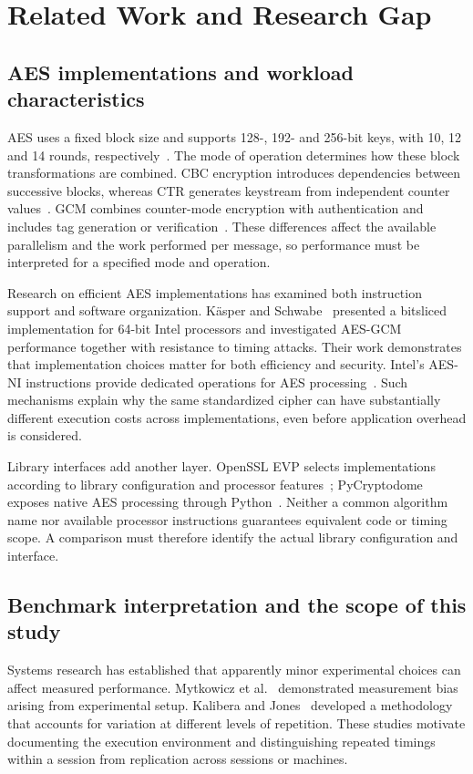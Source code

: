 \section{Related Work and Research Gap}
\label{sec:related}
\subsection{AES implementations and workload characteristics}
AES uses a fixed block size and supports 128-, 192- and 256-bit keys, with 10, 12 and 14 rounds, respectively~\cite{fips197}. The mode of operation determines how these block transformations are combined. CBC encryption introduces dependencies between successive blocks, whereas CTR generates keystream from independent counter values~\cite{sp80038a}. GCM combines counter-mode encryption with authentication and includes tag generation or verification~\cite{sp80038d}. These differences affect the available parallelism and the work performed per message, so performance must be interpreted for a specified mode and operation.

Research on efficient AES implementations has examined both instruction support and software organization. K\"asper and Schwabe~\cite{kasper2009} presented a bitsliced implementation for 64-bit Intel processors and investigated AES-GCM performance together with resistance to timing attacks. Their work demonstrates that implementation choices matter for both efficiency and security. Intel's AES-NI instructions provide dedicated operations for AES processing~\cite{intelaesni}. Such mechanisms explain why the same standardized cipher can have substantially different execution costs across implementations, even before application overhead is considered.

Library interfaces add another layer. OpenSSL EVP selects implementations according to library configuration and processor features~\cite{openssl}; PyCryptodome exposes native AES processing through Python~\cite{pycryptodome}. Neither a common algorithm name nor available processor instructions guarantees equivalent code or timing scope. A comparison must therefore identify the actual library configuration and interface.

\subsection{Benchmark interpretation and the scope of this study}
Systems research has established that apparently minor experimental choices can affect measured performance. Mytkowicz et al.~\cite{mytkowicz2009} demonstrated measurement bias arising from experimental setup. Kalibera and Jones~\cite{kalibera2013} developed a methodology that accounts for variation at different levels of repetition. These studies motivate documenting the execution environment and distinguishing repeated timings within a session from replication across sessions or machines.

